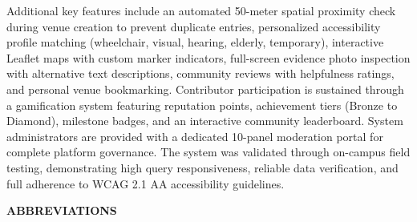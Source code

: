 \documentclass[12pt,a4paper]{report}
\begin{document}
\vspace{0.4cm}
\noindent Additional key features include an automated 50-meter spatial proximity check during venue creation to prevent duplicate entries, personalized accessibility profile matching (wheelchair, visual, hearing, elderly, temporary), interactive Leaflet maps with custom marker indicators, full-screen evidence photo inspection with alternative text descriptions, community reviews with helpfulness ratings, and personal venue bookmarking. Contributor participation is sustained through a gamification system featuring reputation points, achievement tiers (Bronze to Diamond), milestone badges, and an interactive community leaderboard. System administrators are provided with a dedicated 10-panel moderation portal for complete platform governance. The system was validated through on-campus field testing, demonstrating high query responsiveness, reliable data verification, and full adherence to WCAG 2.1 AA accessibility guidelines.

\newpage
\tableofcontents

\newpage
\listoftables

\newpage
\listoffigures

\newpage
\begin{center}
    {\Large \textbf{ABBREVIATIONS}\par}
\end{center}
\vspace{0.8cm}
\end{document}
